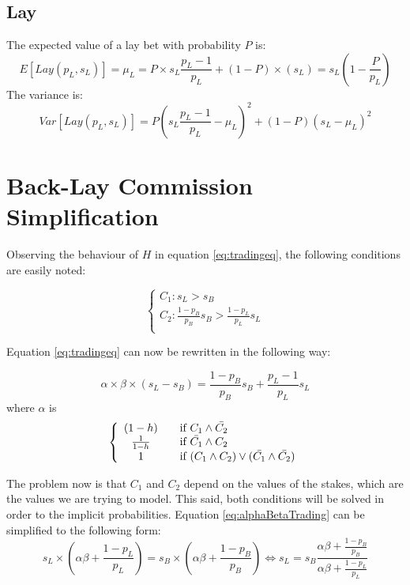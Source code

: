 \documentclass{article}
\begin{document}
\subsection{Lay}
The expected value of a lay bet with probability $P$ is:
\[
E \left[ Lay(p_{L},s_{L}) \right] = \mu_{L} = P \times s_{L}
\frac{p_{L}-1}{p_{L}} + (1-P) \times (s_{L}) = s_{L} \left( 1 -
                                                \frac{P}{p_{L}} \right)
\]
The variance is:
\[
Var \left[ Lay(p_{L},s_{L}) \right] = P \left( s_{L}
\frac{p_{L}-1}{p_{L}} - \mu_{L} \right)^{2} + (1-P) \left( s_{L} -
                                                    \mu_{L} \right)^{2}
\]

\section{Back-Lay Commission Simplification}
\label{apdx:alphaone}
Observing the behaviour of $H$ in equation \ref{eq:tradingeq}, the 
following conditions are easily noted:

$$
    \left\{
    \begin{array}{l}
        C_{1}: s_{L} > s_{B}\\
        C_{2}: \frac{1-p_{B}}{p_{B}}s_{B} > \frac{1-p_{L}}{p_{L}}s_{L} \\
    \end{array} \right.
$$

Equation \ref{eq:tradingeq} can now be rewritten in the following way:

\begin{equation}
\label{eq:alphaBetaTrading}
    \alpha \times \beta \times\left( s_{L}-s_{B}\right) =
                \frac{1-p_{B}}{p_{B}}s_{B} + \frac{p_{L}-1}{p_{L}}s_{L}
\end{equation}
where $\alpha$ is
$$
    \left\{
    \begin{array}{c l}
        (1-h)         & \quad \text{if } C_{1} \wedge \bar{C_{2}}\\
        \frac{1}{1-h} & \quad \text{if }\bar{C_{1}} \wedge C_{2} \\
        1             & \quad \text{if }( C_{1} \wedge C_{2} ) \vee ( \bar{C_{1}} \wedge \bar{C_{2}} )\\
    \end{array} \right.
$$

The problem now is that $C_{1}$ and $C_{2}$ depend on the values of 
the stakes, which are the values we are trying to model. This said, 
both conditions will be solved in order to the implicit 
probabilities. Equation \ref{eq:alphaBetaTrading} can be simplified 
to the following form:
$$
s_{L} \times \left( \alpha \beta + \frac{1-p_{L}}{p_{L}} \right) =
s_{B} \times \left( \alpha \beta + \frac{1-p_{B}}{p_{B}} \right)
                                                        \Leftrightarrow
s_{L} = s_{B} \frac{ \alpha \beta + \frac{1-p_{B}}{p_{B}} }{ \alpha
                                        \beta + \frac{1-p_{L}}{p_{L}} }
$$
\end{document}

